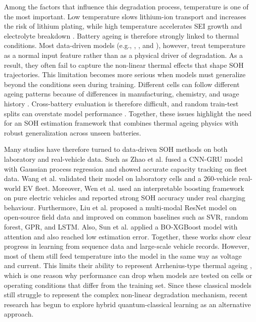 \documentclass[a4paper,fleqn]{cas-sc}
\begin{document}
Among the factors that influence this degradation process, temperature is one of the most important. Low temperature slows lithium-ion transport and increases the risk of lithium plating, while high temperature accelerates SEI growth and electrolyte breakdown \citep{kumar2024,asiri2025}. Battery ageing is therefore strongly linked to thermal conditions. Most data-driven models (e.g., \citep{liu2025multi}, \citep{li2025unified}, \citep{yang2025physics} and \citep{sun2025battery}), however, treat temperature as a normal input feature rather than as a physical driver of degradation. As a result, they often fail to capture the non-linear thermal effects that shape SOH trajectories. This limitation becomes more serious when models must generalize beyond the conditions seen during training. Different cells can follow different ageing patterns because of differences in manufacturing, chemistry, and usage history \citep{lu2024mechanisms}. Cross-battery evaluation is therefore difficult, and random train-test splits can overstate model performance \citep{sedlavrik2025advanced}. Together, these issues highlight the need for an SOH estimation framework that combines thermal ageing physics with robust generalization across unseen batteries.

Many studies have therefore turned to data-driven SOH methods on both laboratory and real-vehicle data. Such as Zhao et al. \citep{zhao2025capacity} fused a CNN-GRU model with Gaussian process regression and showed accurate capacity tracking on fleet data. Wang et al. \citep{wang2026lithium} validated their model on laboratory cells and a 260-vehicle real-world EV fleet. Moreover, Wen et al. \citep{wen2024lithium} used an interpretable boosting framework on pure electric vehicles and reported strong SOH accuracy under real charging behaviour. Furthermore, Liu et al. \citep{liu2025multi} proposed a multi-modal ResNet model on open-source field data and improved on common baselines such as SVR, random forest, GPR, and LSTM. Also, Sun et al. \citep{sun2025battery} applied a BO-XGBoost model with attention and also reached low estimation error. Together, these works show clear progress in learning from sequence data and large-scale vehicle records. However, most of them still feed temperature into the model in the same way as voltage and current. This limits their ability to represent Arrhenius-type thermal ageing \citep{gao2023effect}, which is one reason why performance can drop when models are tested on cells or operating conditions that differ from the training set. Since these classical models still struggle to represent the complex non-linear degradation mechanism, recent research has begun to explore hybrid quantum-classical learning as an alternative approach.
\end{document}
